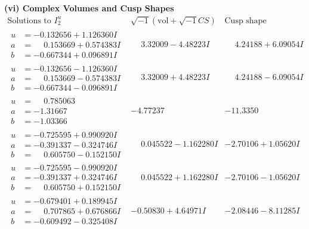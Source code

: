 \documentclass[1p]{elsarticle_modified}
\theoremstyle{definition}
\newcommand{\I}{\sqrt{-1}}
\begin{document}
\newpage\flushleft \textbf{(vi) Complex Volumes and Cusp Shapes}
$$\begin{array}{c|c|c}  
\text{Solutions to }I^u_{2}& \I (\text{vol} + \sqrt{-1}CS) & \text{Cusp shape}\\
 \hline 
\begin{aligned}
u &= -0.132656 + 1.126360 I \\
a &= \phantom{-}0.153669 + 0.574383 I \\
b &= -0.667344 + 0.096891 I\end{aligned}
 & \phantom{-}3.32009 - 4.48223 I & \phantom{-}4.24188 + 6.09054 I \\ \hline\begin{aligned}
u &= -0.132656 - 1.126360 I \\
a &= \phantom{-}0.153669 - 0.574383 I \\
b &= -0.667344 - 0.096891 I\end{aligned}
 & \phantom{-}3.32009 + 4.48223 I & \phantom{-}4.24188 - 6.09054 I \\ \hline\begin{aligned}
u &= \phantom{-}0.785063\phantom{ +0.000000I} \\
a &= -1.31667\phantom{ +0.000000I} \\
b &= -1.03366\phantom{ +0.000000I}\end{aligned}
 & -4.77237\phantom{ +0.000000I} & -11.3350\phantom{ +0.000000I} \\ \hline\begin{aligned}
u &= -0.725595 + 0.990920 I \\
a &= -0.391337 - 0.324746 I \\
b &= \phantom{-}0.605750 - 0.152150 I\end{aligned}
 & \phantom{-}0.045522 - 1.162280 I & -2.70106 + 1.05620 I \\ \hline\begin{aligned}
u &= -0.725595 - 0.990920 I \\
a &= -0.391337 + 0.324746 I \\
b &= \phantom{-}0.605750 + 0.152150 I\end{aligned}
 & \phantom{-}0.045522 + 1.162280 I & -2.70106 - 1.05620 I \\ \hline\begin{aligned}
u &= -0.679401 + 0.189945 I \\
a &= \phantom{-}0.707865 + 0.676866 I \\
b &= -0.609492 - 0.325408 I\end{aligned}
 & -0.50830 + 4.64971 I & -2.08446 - 8.11285 I \\ \hline\begin{aligned}

\end{aligned}
\end{array}$$
\end{document}

